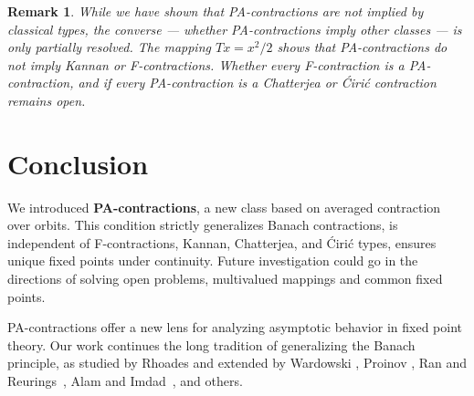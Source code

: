 \documentclass[11pt]{article}
\newtheorem{remark}[theorem]{Remark}
\begin{document}
\begin{remark}
While we have shown that PA-contractions are not implied by classical types, the converse — whether PA-contractions imply other classes — is only partially resolved. The mapping $ T x = x^2/2 $ shows that PA-contractions do not imply Kannan or F-contractions. Whether every F-contraction is a PA-contraction, and if every 
PA-contraction is a Chatterjea or \'Ciri\'c contraction remains open.
\end{remark}

\section{Conclusion}

We introduced \textbf{PA-contractions}, a new class based on averaged contraction over orbits. This condition strictly generalizes Banach contractions,
is independent of F-contractions, Kannan, Chatterjea, and \'Ciri\'c types,
ensures unique fixed points under continuity. Future investigation could go
in the directions of solving open problems, multivalued mappings and common fixed points.

PA-contractions offer a new lens for analyzing asymptotic behavior in fixed point theory.
Our work continues the long tradition of generalizing the Banach principle, as studied by Rhoades \cite{Rhoades1977} and extended by Wardowski \cite{Wardowski2012}, Proinov \cite{Proinov2020}, Ran and 
Reurings~\cite{Ran2004}, Alam and Imdad~\cite{Alam2017}, and others.
\end{document}
